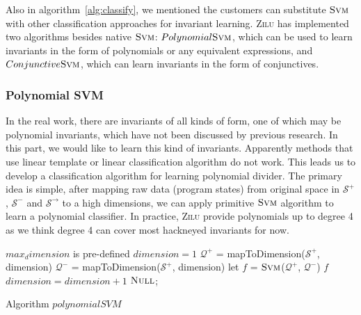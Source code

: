 Also in algorithm~\ref{alg:classify}, we mentioned the customers can substitute $\textsc{Svm}$ with other classification approaches for invariant learning.
\textsc{Zilu} has implemented two algorithms besides native $\textsc{Svm}$: 
$Polynomial \textsc{Svm}$, which can be used to learn invariants in the form of polynomials or any equivalent expressions,
and $Conjunctive \textsc{Svm}$, which can learn invariants in the form of conjunctives.

\subsubsection{Polynomial SVM}
In the real work, there are invariants of all kinds of form, one of which may be polynomial invariants, which have not been discussed by previous research.
In this part, we would like to learn this kind of invariants.
Apparently methods that use linear template or linear classification algorithm do not work.
This leads us to develop a classification algorithm for learning polynomial divider.
The primary idea is simple, after mapping raw data (program states) from original space in $\mathcal{S}^+$, $\mathcal{S}^-$ and $\mathcal{S}^\rightarrow$ to a high dimensions, 
we can apply primitive $\textsc{Svm}$ algorithm to learn a polynomial classifier. 
In practice, \textsc{Zilu} provide polynomials up to degree 4 as we think degree 4 can cover most hackneyed invariants for now.

\begin{algorithm}[!h]
\SetAlgoVlined
\Indm
{}
\Indp
    $max_dimension$ is pre-defined\;
    $dimension = 1$\;
     {
        $\mathcal{Q}^+$ = mapToDimension($\mathcal{S}^+$, dimension)\;
        $\mathcal{Q}^-$ = mapToDimension($\mathcal{S}^+$, dimension)\;
        let $f$ = $\textsc{Svm}$($\mathcal{Q}^+$, $\mathcal{Q}^-$)\;
         {
        	\Return $f$\;
    	}
    	$dimension = dimension + 1$\;
    }
    \Return $\textsc{Null}$;
\caption{Algorithm $polynomialSVM$}
\label{alg:polynomialSVM}
\end{algorithm}

